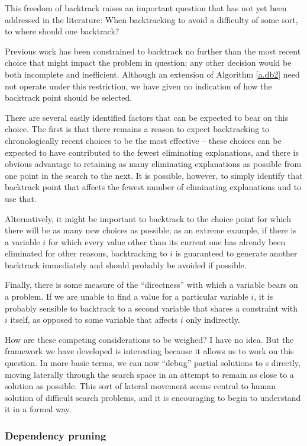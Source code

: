 This freedom of backtrack raises an important question that has not
yet been addressed in the literature: When backtracking to avoid a
difficulty of some sort, to where should one backtrack?

Previous work has been constrained to backtrack no further than the
most recent choice that might impact the problem in question; any
other decision would be both incomplete and inefficient.  Although an
extension of Algorithm \ref{a.db2} need not operate under this
restriction, we have given no indication of how the backtrack point
should be selected.

There are several easily identified factors that can be expected to
bear on this choice.  The first is that there remains a reason to
expect backtracking to chronologically recent choices to be the most
effective -- these choices can be expected to have contributed to the
fewest eliminating explanations, and there is obvious advantage to
retaining as many eliminating explanations as possible from one point
in the search to the next.  It is possible, however, to simply
identify that backtrack point that affects the fewest number of
eliminating explanations and to use that.

Alternatively, it might be important to backtrack to the choice point
for which there will be as many new choices as possible; as an extreme
example, if there is a variable $i$ for which every value other than
its current one has already been eliminated for other reasons,
backtracking to $i$ is guaranteed to generate another backtrack
immediately and should probably be avoided if possible.

Finally, there is some measure of the ``directness'' with which a
variable bears on a problem.  If we are unable to find a value for a
particular variable $i$, it is probably sensible to backtrack to a
second variable that shares a constraint with $i$ itself, as opposed
to some variable that affects $i$ only indirectly.

How are these competing considerations to be weighed?  I have no idea.
But the framework we have developed is interesting because it allows
us to work on this question.  In more basic terms, we can now
``debug'' partial solutions to \csp s directly, moving laterally
through the search space in an attempt to remain as close to a
solution as possible.  This sort of lateral movement seems central to
human solution of difficult search problems, and it is encouraging to
begin to understand it in a formal way.

\subsubsection{Dependency pruning}

